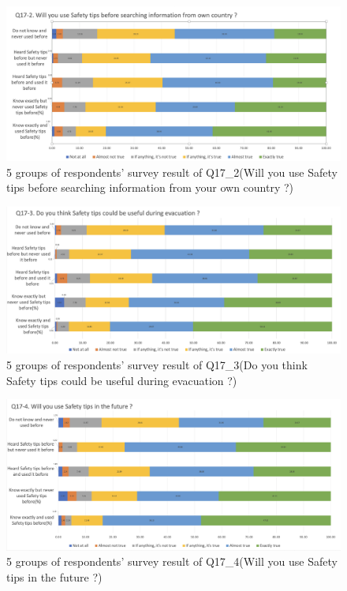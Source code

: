 \begin{figure}[h]
  \includegraphics[width=0.8\linewidth]{Figure/Figure20.jpg}
  \centering
  \caption[5 groups of respondents' survey result of Q17\_2]{5 groups of respondents' survey result of Q17\_2(Will you use Safety tips before searching information from your own country ?)}
  \label{fig20}
\end{figure}

\begin{figure}[h]
  \includegraphics[width=0.8\linewidth]{Figure/Figure21.jpg}
  \centering
  \caption[5 groups of respondents' survey result of Q17\_3]{5 groups of respondents' survey result of Q17\_3(Do you think Safety tips could be useful during evacuation ?)}
  \label{fig21}
\end{figure}

\begin{figure}[h]
  \includegraphics[width=0.8\linewidth]{Figure/Figure22.jpg}
  \centering
  \caption[5 groups of respondents' survey result of Q17\_4]{5 groups of respondents' survey result of Q17\_4(Will you use Safety tips in the future ?)}
  \label{fig22}
\end{figure}

